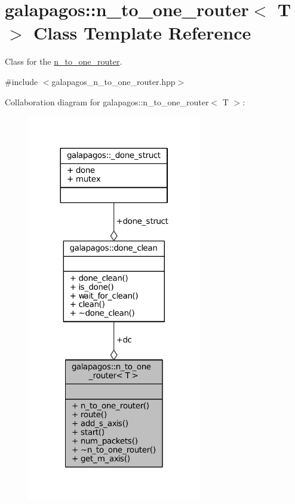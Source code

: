 \hypertarget{classgalapagos_1_1n__to__one__router}{}\section{galapagos\+:\+:n\+\_\+to\+\_\+one\+\_\+router$<$ T $>$ Class Template Reference}
\label{classgalapagos_1_1n__to__one__router}


Class for the \hyperlink{classgalapagos_1_1n__to__one__router}{n\+\_\+to\+\_\+one\+\_\+router}.  




{\ttfamily \#include $<$galapagos\+\_\+n\+\_\+to\+\_\+one\+\_\+router.\+hpp$>$}



Collaboration diagram for galapagos\+:\+:n\+\_\+to\+\_\+one\+\_\+router$<$ T $>$\+:
\nopagebreak
\begin{figure}[H]
\begin{center}
\leavevmode
\includegraphics[width=216pt]{classgalapagos_1_1n__to__one__router__coll__graph}
\end{center}
\end{figure}
